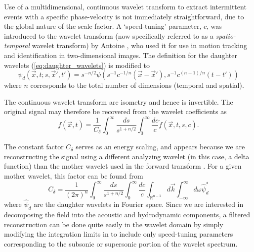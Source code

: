 Use of a multidimensional, continuous wavelet transform to extract intermittent events with a specific phase-velocity is not immediately straightforward, due to the global nature of the scale factor. 
A `speed-tuning' parameter, $c$, was introduced to the wavelet transform (now specifically referred to as a \textit{spatio-temporal} wavelet transform) by Antoine \etal \citep{Antoine2004}, who used it for use in motion tracking and identification in two-dimensional images. 
The definition for the daughter wavelets (\ref{eq:daughter_wavelets}) is modified to
\begin{equation}
	\psi_d \left( \vec{x}, t;s,\vec{x}', t' \right) = s^{-n/2} \psi \left(s^{-1} c^{-1/n} (\vec{x}-\vec{x}'), s^{-1} c^{(n-1)/n} (t-t') \right)
\end{equation} 
where $n$ corresponds to the total number of dimensions (temporal and spatial).

The continuous wavelet transform are isometry \citep{Antoine2004} and hence is invertible.
The original signal may therefore be recovered from the wavelet coefficients as 
\begin{equation}
	f(\vec{x},t) = \frac{1}{C_\delta} \int_0^\infty \frac{ds}{s^{1 + n/2}} \int_{0}^{\infty} \frac{dc}{c} \tilde{f} (\vec{x},t,s,c).
	\label{eq:wavelet_filter}
\end{equation}

The constant factor $C_\delta$ serves as an energy scaling, and appears because we are reconstructing the signal using a different analyzing wavelet (in this case, a delta function) than the mother wavelet used in the forward transform \citep{Torrence1998,Farge1992,Antoine2004}. 
For a given mother wavelet, this factor can be found from
\begin{equation}
	C_\delta = \frac{1}{(2 \pi)^n} \int_0^\infty \frac{ds}{s^{1 + n/2}} \int_{0}^{\infty} \frac{dc}{c} \int_{\mathbb{R}^{n-1}} d \vec{k} \int_{-\infty}^{\infty} d\omega \hat{\psi}_d^*
\end{equation}
where $\hat{\psi}_d$ are the daughter wavelets in Fourier space. 
Since we are interested in decomposing the field into the acoustic and hydrodynamic components, a filtered reconstruction can be done quite easily in the wavelet domain by simply modifying the integration limits in  to include only speed-tuning parameters corresponding to the subsonic or supersonic portion of the wavelet spectrum.

